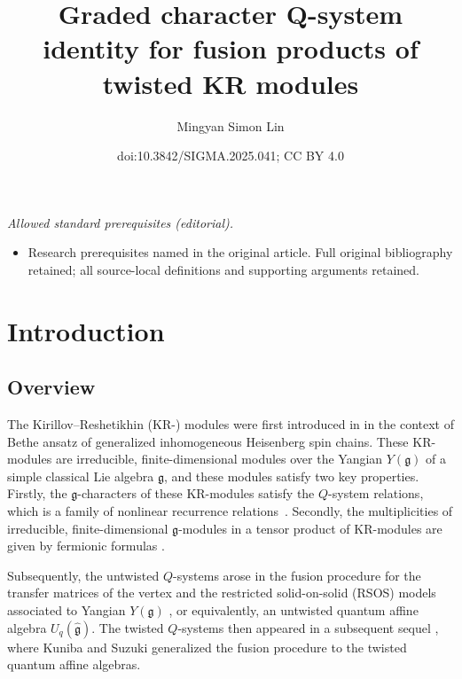 \documentclass[10pt,a4paper]{amsart}
\title{Graded character Q-system identity for fusion products of twisted KR modules}
\author{Mingyan Simon Lin}
\date{doi:10.3842/SIGMA.2025.041; CC BY 4.0}
\numberwithin{equation}{section}
\begin{document}
\maketitle
\noindent\textit{Allowed standard prerequisites (editorial).}\begin{itemize}
\item Research prerequisites named in the original article. Full original bibliography retained; all source-local definitions and supporting arguments retained.
\end{itemize}\medskip
\section{Introduction}\label{Section 1}

\subsection{Overview}\label{Section 1.1}

The Kirillov--Reshetikhin (KR-) modules were first introduced in \cite{KR87} in the context of Bethe ansatz of generalized inhomogeneous Heisenberg spin chains. These KR-modules are irreducible, finite-dimensional modules over the Yangian $Y(\mathfrak{g})$ of a simple classical Lie algebra $\mathfrak{g}$, and these modules satisfy two key properties. Firstly, the $\mathfrak{g}$-characters of these KR-modules satisfy the $Q$-system relations, which is a family of nonlinear recurrence relations~\cite{Kirillov89,KR87}. Secondly, the multiplicities of irreducible, finite-dimensional $\mathfrak{g}$-modules in a tensor product of KR-modules are given by fermionic formulas \cite{KR87}.

Subsequently, the untwisted $Q$-systems arose in the fusion procedure for the transfer matrices of the vertex and the restricted solid-on-solid (RSOS) models associated to Yangian $Y(\mathfrak{g})$ \cite{KNS94}, or equivalently, an untwisted quantum affine algebra $U_q(\widehat{\mathfrak{g}})$. The twisted $Q$-systems then appeared in a subsequent sequel \cite{KS95}, where Kuniba and Suzuki generalized the fusion procedure to the twisted quantum affine algebras.
\end{document}
